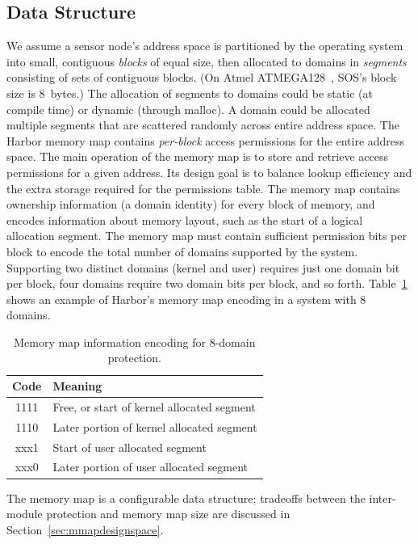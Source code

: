 \subsection{Data Structure}
%
We assume a sensor node's address space is partitioned by the operating
system into small, contiguous \emph{blocks} of equal size, then allocated
to domains in \textit{segments} consisting of sets of contiguous blocks.
%
(On Atmel ATMEGA128~\cite{avrdatasheet}, SOS's block size is 8~bytes.)
%
The allocation of segments to domains could be static (at compile
time) or dynamic (through malloc).
%
A domain could be allocated multiple segments that are scattered
randomly across entire address space.
%
The Harbor memory map contains \emph{per-block} access permissions for
the entire address space.
%
The main operation of the memory map is to store and retrieve access
permissions for a given address.
%
Its design goal is to balance lookup efficiency and the extra storage
required for the permissions table.
%
The memory map contains ownership information (a domain identity) for every
block of memory, and encodes information about memory layout, such as
the start of a logical allocation segment.
%
The memory map must contain sufficient permission bits per block to encode
the total number of domains supported by the system.
%
Supporting two distinct domains (kernel and user) requires just one
domain bit per block, four domains require two domain bits per block,
and so forth.
%
Table~\ref{tab:mmap_table} shows an example of Harbor's memory map encoding
in a system with 8 domains.
%
\begin{table}[htdp]
\centering
\small{
\begin{tabular}{|c|l|}
	\hline
	Code & Meaning\\
	\hline
	1111 & Free, or start of kernel allocated segment\\
	1110 & Later portion of kernel allocated segment\\
	xxx1 & Start of user allocated segment\\
	xxx0 & Later portion of user allocated segment\\
	\hline
\end{tabular}}
\caption{Memory map information encoding for 8-domain protection.}
\label{tab:mmap_table}
\end{table}

%
The memory map is a configurable data structure; tradeoffs between
the inter-module protection and memory map size are discussed in
Section~\ref{sec:mmapdesignspace}.
%
%
%
%
%
%
%
